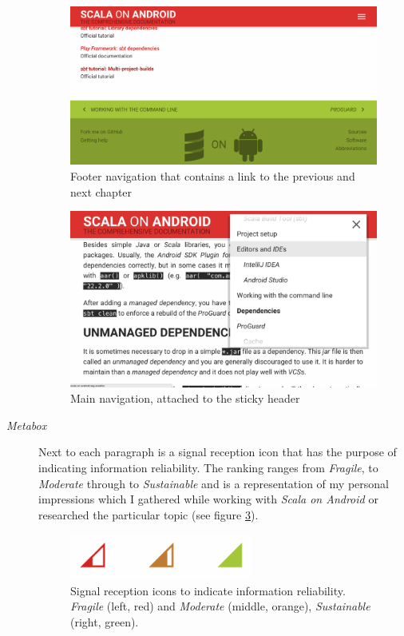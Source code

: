 \begin{description}
	\begin{figure}[]
		\includegraphics[width=\textwidth]{asset/story-telling.png}
		\caption{Footer navigation that contains a link to the previous and next chapter}
		\label{story-telling}
	\end{figure}

	\begin{figure}[]
		\includegraphics[width=\textwidth]{asset/navigation.png}
		\caption{Main navigation, attached to the sticky header}
		\label{navigation}
	\end{figure}

	\item[\textit{Metabox}]\hfill

	Next to each paragraph is a signal reception icon that has the purpose of indicating information reliability. The ranking ranges from \textit{Fragile}, to \textit{Moderate} through to \textit{Sustainable} and is a representation of my personal impressions which I gathered while working with \textit{Scala on Android} or researched the particular topic (see figure \ref{reception-icons}).

	\begin{figure}[]
		\center
		\includegraphics[width=6cm]{asset/reception-icons.png}
		\caption{Signal reception icons to indicate information reliability. \textit{Fragile} (left, red) and \textit{Moderate} (middle, orange), \textit{Sustainable} (right, green).}
		\label{reception-icons}
	\end{figure}


\end{description}
